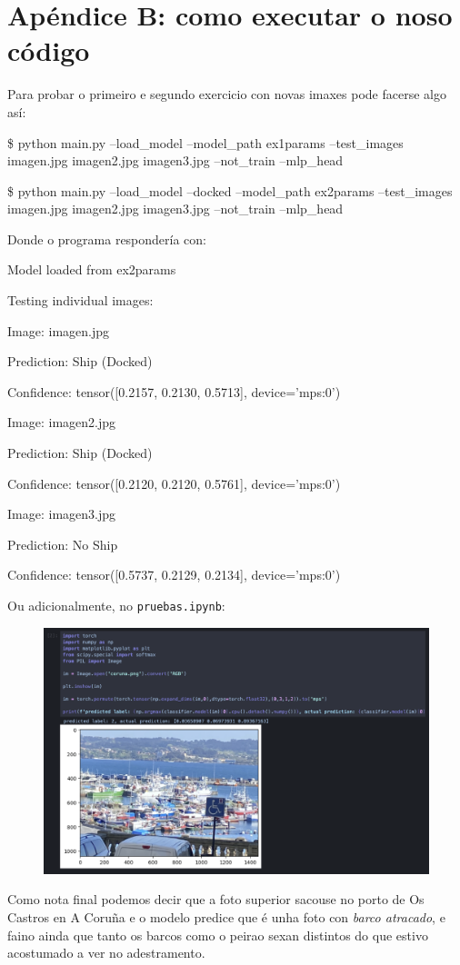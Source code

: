 \documentclass{article}
\begin{document}
\newpage
\section{Apéndice B: como executar o noso código}

Para probar o primeiro e segundo exercicio con novas imaxes pode facerse algo así:

\begin{clibox}
\$ python main.py --load\_model   --model\_path ex1params --test\_images imagen.jpg imagen2.jpg imagen3.jpg --not\_train --mlp\_head

\$ python main.py --load\_model  --docked --model\_path ex2params --test\_images imagen.jpg imagen2.jpg imagen3.jpg --not\_train --mlp\_head


\end{clibox}


Donde o programa respondería con:

\begin{clibox}

Model loaded from ex2params

Testing individual images:

Image: imagen.jpg

Prediction: Ship (Docked)

Confidence: tensor([0.2157, 0.2130, 0.5713], device='mps:0')

Image: imagen2.jpg

Prediction: Ship (Docked)

Confidence: tensor([0.2120, 0.2120, 0.5761], device='mps:0')

Image: imagen3.jpg

Prediction: No Ship

Confidence: tensor([0.5737, 0.2129, 0.2134], device='mps:0')
\end{clibox}

Ou adicionalmente, no \texttt{pruebas.ipynb}:

\begin{figure}[H]
	\centering
	\includegraphics[width=0.8\linewidth]{ejecucion.png}
\end{figure}

Como nota final podemos decir que a foto superior sacouse no porto de Os Castros en A Coruña e o modelo predice que é unha foto con \emph{barco atracado}, e faino ainda que tanto os barcos como o peirao sexan distintos do que estivo acostumado a ver no adestramento.

\newpage



\end{document}
